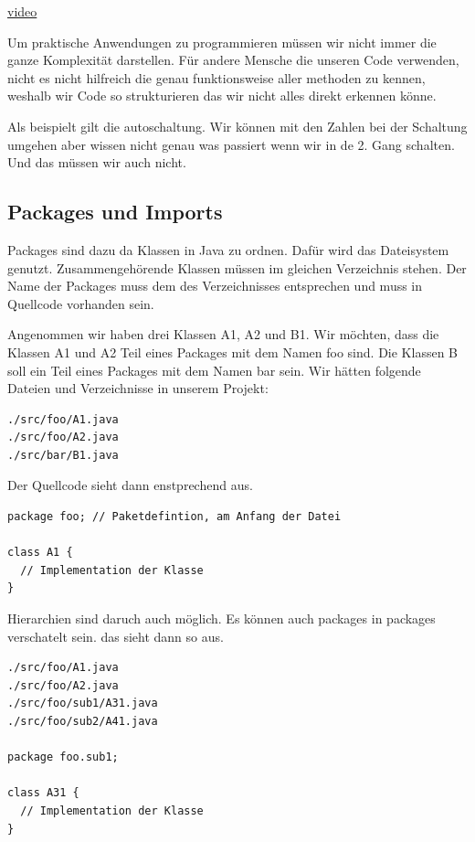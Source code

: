 \documentclass[12pt]{article}
\begin{document}
    \href{https://unibas.cloud.panopto.eu/Panopto/Pages/Viewer.aspx?id=27c8490a-6428-452a-901e-af4e008d22f7&start=5.634217}{video}

    Um praktische Anwendungen zu programmieren müssen wir nicht immer die ganze Komplexität darstellen. 
    Für andere Mensche die unseren Code verwenden, nicht es nicht hilfreich die genau funktionsweise aller methoden zu kennen, 
    weshalb wir Code so strukturieren das wir nicht alles direkt erkennen könne. 

    Als beispielt gilt die autoschaltung. Wir können mit den Zahlen bei der Schaltung umgehen aber wissen 
    nicht genau was passiert wenn wir in de 2. Gang schalten. Und das müssen wir auch nicht. 

    \subsection*{Packages und Imports}

    Packages sind dazu da Klassen in Java zu ordnen. Dafür wird das Dateisystem genutzt. Zusammengehörende Klassen 
    müssen im gleichen Verzeichnis stehen. Der Name der Packages muss dem des Verzeichnisses entsprechen und muss in Quellcode vorhanden sein. 

    Angenommen wir haben drei Klassen A1, A2 und B1. Wir möchten, 
    dass die Klassen A1 und A2 Teil eines Packages mit dem Namen foo sind. 
    Die Klassen B soll ein Teil eines Packages mit dem Namen bar sein. 
    Wir hätten folgende Dateien und Verzeichnisse in unserem Projekt:

    \begin{lstlisting}[caption=packages]
./src/foo/A1.java
./src/foo/A2.java
./src/bar/B1.java
    \end{lstlisting}

    Der Quellcode sieht dann enstprechend aus. 

    \begin{lstlisting}[caption=quellcode]
package foo; // Paketdefintion, am Anfang der Datei

class A1 {
  // Implementation der Klasse
}
    \end{lstlisting}

    Hierarchien sind daruch auch möglich. Es können auch packages in packages verschatelt sein. das sieht dann so aus. 

    \begin{lstlisting}[caption=verschatelt packages]
./src/foo/A1.java
./src/foo/A2.java
./src/foo/sub1/A31.java
./src/foo/sub2/A41.java

package foo.sub1;

class A31 {
  // Implementation der Klasse
}
    \end{lstlisting}
\end{document}
